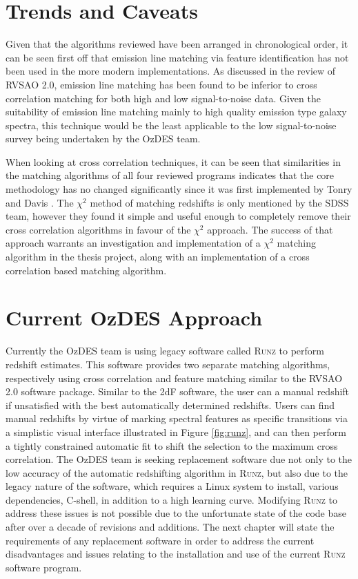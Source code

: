 \documentclass[titlesmallcaps, examinerscopy, copyrightpage]{uqthesis}
\begin{document}
\section{Trends and Caveats}

Given that the algorithms reviewed have been arranged in chronological order, it can be seen first off that emission line matching via feature identification has not been used in the more modern implementations. As discussed in the review of RVSAO 2.0, emission line matching has been found to be inferior to cross correlation matching for both high and low signal-to-noise data. Given the suitability of emission line matching mainly to high quality emission type galaxy spectra, this technique would be the least applicable to the low signal-to-noise survey being undertaken by the OzDES team.

When looking at cross correlation techniques, it can be seen that similarities in the matching algorithms of all four reviewed programs indicates that the core methodology has no changed significantly since it was first implemented by Tonry and Davis \cite{tonry1979survey}. The $\chi^2$ method of matching redshifts is only mentioned by the SDSS team, however they found it simple and useful enough to completely remove their cross correlation algorithms in favour of the $\chi^2$ approach. The success of that approach warrants an investigation and implementation of a $\chi^2$ matching algorithm in the thesis project, along with an implementation of a cross correlation based matching algorithm.


\section{Current OzDES Approach}

Currently the OzDES team is using legacy software called \textsc{Runz} to perform redshift estimates. This software provides two separate matching algorithms, respectively using cross correlation and feature matching similar to the RVSAO 2.0 software package. Similar to the 2dF software, the user can a manual redshift if unsatisfied with the best automatically determined redshifts. Users can find manual redshifts by virtue of marking spectral features as specific transitions via a simplistic visual interface illustrated in Figure \ref{fig:runz}, and can then perform a tightly constrained  automatic fit to shift the selection to the maximum cross correlation. The OzDES team is seeking replacement software due not only to the low accuracy of the automatic redshifting algorithm in \textsc{Runz}, but also due to the legacy nature of the software, which requires a Linux system to install, various dependencies, C-shell, in addition to a high learning curve. Modifying \textsc{Runz} to address these issues is not possible due to the unfortunate state of the code base after over a decade of revisions and additions. The next chapter will state the requirements of any replacement software in order to address the current disadvantages and issues relating to the installation and use of the current \textsc{Runz} software program.
\end{document}
